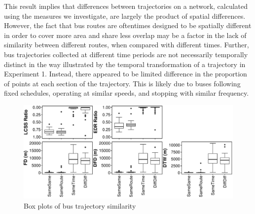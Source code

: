 \documentclass{interact}
\begin{document}
This result implies that differences between trajectories on a network, calculated using the measures we investigate, are largely the product of spatial differences. However, the fact that bus routes are oftentimes designed to be spatially different in order to cover more area and share less overlap may be a factor in the lack of similarity between different routes, when compared with different times. Further, bus trajectories collected at different time periods are not necessarily temporally distinct in the way illustrated by the temporal transformation of a trajectory in Experiment 1. Instead, there appeared to be limited difference in the proportion of points at each section of the trajectory. This is likely due to buses following fixed schedules, operating at similar speeds, and stopping with similar frequency.



\begin{figure}[ht]
	\includegraphics[width=\linewidth]{figures/Exp2}
	\caption{Box plots of bus trajectory similarity} \label{fig:bus_all}
\end{figure}

\end{document}
